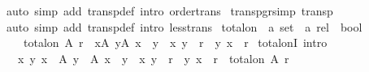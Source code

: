 \begin{isabellebody}
%
\isadelimproof
%
\endisadelimproof
%
\isatagproof
{}\isamarkupfalse%
{\isacharparenleft}{\kern0pt}auto\ simp\ add{\isacharcolon}{\kern0pt}\ transp{\isacharunderscore}{\kern0pt}def\ intro{\isacharcolon}{\kern0pt}\ order{\isacharunderscore}{\kern0pt}trans{\isacharparenright}{\kern0pt}%
\endisatagproof
{\isafoldproof}%
%
\isadelimproof
\isanewline
%
\endisadelimproof
\isanewline
{}\isamarkupfalse%
\ transp{\isacharunderscore}{\kern0pt}gr{\isacharbrackleft}{\kern0pt}simp{\isacharbrackright}{\kern0pt}{\isacharcolon}{\kern0pt}\ {\isachardoublequoteopen}transp\ {\isacharparenleft}{\kern0pt}{\isachargreater}{\kern0pt}{\isacharparenright}{\kern0pt}{\isachardoublequoteclose}\isanewline
%
\isadelimproof
%
\endisadelimproof
%
\isatagproof
{}\isamarkupfalse%
{\isacharparenleft}{\kern0pt}auto\ simp\ add{\isacharcolon}{\kern0pt}\ transp{\isacharunderscore}{\kern0pt}def\ intro{\isacharcolon}{\kern0pt}\ less{\isacharunderscore}{\kern0pt}trans{\isacharparenright}{\kern0pt}%
\endisatagproof
{\isafoldproof}%
%
\isadelimproof
\isanewline
%
\endisadelimproof
\isanewline
{}\isamarkupfalse%
%
\isadelimdocument
%
\endisadelimdocument
%
\isatagdocument
%
\isamarkuptrue%
%
\endisatagdocument
{\isafolddocument}%
%
\isadelimdocument
%
\endisadelimdocument
{}\isamarkupfalse%
\ total{\isacharunderscore}{\kern0pt}on\ {\isacharcolon}{\kern0pt}{\isacharcolon}{\kern0pt}\ {\isachardoublequoteopen}{\isacharprime}{\kern0pt}a\ set\ {\isasymRightarrow}\ {\isacharprime}{\kern0pt}a\ rel\ {\isasymRightarrow}\ bool{\isachardoublequoteclose}\isanewline
\ \ \ {\isachardoublequoteopen}total{\isacharunderscore}{\kern0pt}on\ A\ r\ {\isasymlongleftrightarrow}\ {\isacharparenleft}{\kern0pt}{\isasymforall}x{\isasymin}A{\isachardot}{\kern0pt}\ {\isasymforall}y{\isasymin}A{\isachardot}{\kern0pt}\ x\ {\isasymnoteq}\ y\ {\isasymlongrightarrow}\ {\isacharparenleft}{\kern0pt}x{\isacharcomma}{\kern0pt}\ y{\isacharparenright}{\kern0pt}\ {\isasymin}\ r\ {\isasymor}\ {\isacharparenleft}{\kern0pt}y{\isacharcomma}{\kern0pt}\ x{\isacharparenright}{\kern0pt}\ {\isasymin}\ r{\isacharparenright}{\kern0pt}{\isachardoublequoteclose}\isanewline
\isanewline
{}\isamarkupfalse%
\ total{\isacharunderscore}{\kern0pt}onI\ {\isacharbrackleft}{\kern0pt}intro{\isacharquery}{\kern0pt}{\isacharbrackright}{\kern0pt}{\isacharcolon}{\kern0pt}\isanewline
\ \ {\isachardoublequoteopen}{\isacharparenleft}{\kern0pt}{\isasymAnd}x\ y{\isachardot}{\kern0pt}\ {\isasymlbrakk}x\ {\isasymin}\ A{\isacharsemicolon}{\kern0pt}\ y\ {\isasymin}\ A{\isacharsemicolon}{\kern0pt}\ x\ {\isasymnoteq}\ y{\isasymrbrakk}\ {\isasymLongrightarrow}\ {\isacharparenleft}{\kern0pt}x{\isacharcomma}{\kern0pt}\ y{\isacharparenright}{\kern0pt}\ {\isasymin}\ r\ {\isasymor}\ {\isacharparenleft}{\kern0pt}y{\isacharcomma}{\kern0pt}\ x{\isacharparenright}{\kern0pt}\ {\isasymin}\ r{\isacharparenright}{\kern0pt}\ {\isasymLongrightarrow}\ total{\isacharunderscore}{\kern0pt}on\ A\ r{\isachardoublequoteclose}\isanewline

\end{isabellebody}

